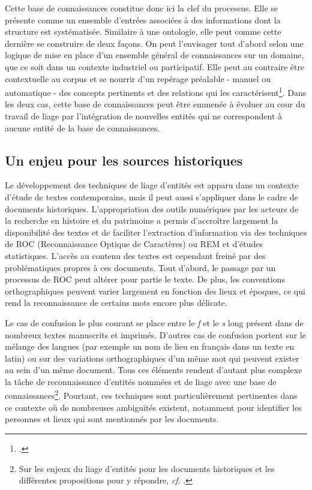 \documentclass[a4paper,12pt,twoside]{book}
\begin{document}
	Cette base de connaissances constitue donc ici la clef du processus. Elle se présente comme un ensemble d'entrées associées à des informations dont la structure est systématisée. Similaire à une ontologie, elle peut comme cette dernière se construire de deux façons. On peut l'envisager tout d'abord selon une logique de mise en place d'un ensemble général de connaissances sur un domaine, que ce soit dans un contexte industriel ou participatif. Elle peut au contraire être contextuelle au corpus et se nourrir d'un repérage préalable - manuel ou automatique - des concepts pertinents et des relations qui les caractérisent\footcite[p. 33]{stern_identification_2013}. Dans les deux cas, cette base de connaissances peut être emmenée à évoluer au cour du travail de liage par l'intégration de nouvelles entités qui ne correspondent à aucune entité de la base de connaissances.
	
	\subsection{Un enjeu pour les sources historiques}
	
	Le développement des techniques de liage d'entités est apparu dans un contexte d'étude de textes contemporains, mais il peut aussi s'appliquer dans le cadre de documents historiques. L'appropriation des outils numériques par les acteurs de la recherche en histoire et du patrimoine a permis d'accroître largement la disponibilité des textes et de faciliter l'extraction d'information via des techniques de ROC (Reconnaissance Optique de Caractères) ou REM et d'études statistiques. L'accès au contenu des textes est cependant freiné par des problématiques propres à ces documents. Tout d'abord, le passage par un processus de ROC peut altérer pour partie le texte. De plus, les conventions orthographiques peuvent varier largement en fonction des lieux et époques, ce qui rend la reconnaissance de certains mots encore plus délicate.
	
	Le cas de confusion le plus courant se place entre le \textit{f} et le \textit{s} long présent dans de nombreux textes manuscrits et imprimés. D'autres cas de confusion portent sur le mélange des langues (par exemple un nom de lieu en français dans un texte en latin) ou sur des variations orthographiques d'un même mot qui peuvent exister au sein d'un même document. Tous ces éléments rendent d'autant plus complexe la tâche de reconnaissance d'entités nommées et de liage avec une base de connaissances\footnote{Sur les enjeux du liage d'entités pour les documents historiques et les différentes propositions pour y répondre, \textit{cf}. \cite{linhares_pontes_entity_2020}.}. Pourtant, ces techniques sont particulièrement pertinentes dans ce contexte où de nombreuses ambiguïtés existent, notamment pour identifier les personnes et lieux qui sont mentionnés par les documents.
	
\end{document}
